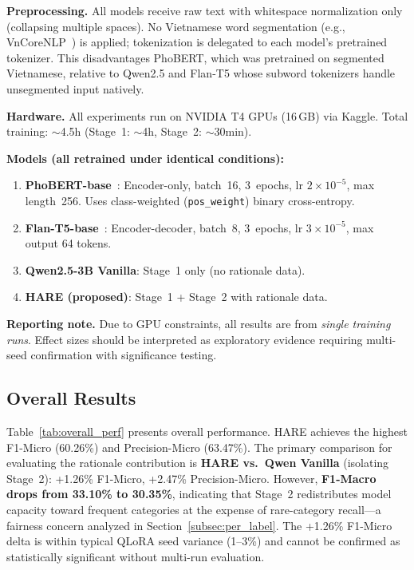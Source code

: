 \documentclass[conference]{IEEEtran}
\begin{document}
\textbf{Preprocessing.} All models receive raw text with whitespace
normalization only (collapsing multiple spaces). No Vietnamese word segmentation
(e.g., VnCoreNLP~\cite{Vu2018VnCoreNLP}) is applied; tokenization is delegated
to each model's pretrained tokenizer. This disadvantages PhoBERT, which was
pretrained on segmented Vietnamese, relative to Qwen2.5 and Flan-T5 whose
subword tokenizers handle unsegmented input natively.

\textbf{Hardware.} All experiments run on NVIDIA T4 GPUs (16\,GB) via Kaggle.
Total training: ${\sim}$4.5h (Stage~1: ${\sim}$4h, Stage~2: ${\sim}$30min).

\textbf{Models (all retrained under identical conditions):}
\begin{enumerate}[leftmargin=*]
\item \textbf{PhoBERT-base}~\cite{nguyen2020phobert}: Encoder-only, batch~16,
3~epochs, lr $2{\times}10^{-5}$, max length~256. Uses class-weighted
(\texttt{pos\_weight}) binary cross-entropy.
\item \textbf{Flan-T5-base}~\cite{chung2022scaling}: Encoder-decoder, batch~8,
3~epochs, lr $3{\times}10^{-5}$, max output 64 tokens.
\item \textbf{Qwen2.5-3B Vanilla}: Stage~1 only (no rationale data).
\item \textbf{HARE (proposed)}: Stage~1 + Stage~2 with rationale data.
\end{enumerate}

\textbf{Reporting note.} Due to GPU constraints, all results are from
\textit{single training runs}. Effect sizes should be interpreted as exploratory
evidence requiring multi-seed confirmation with significance testing.

\subsection{Overall Results}

Table~\ref{tab:overall_perf} presents overall performance. HARE achieves the
highest F1-Micro (60.26\%) and Precision-Micro (63.47\%). The primary comparison
for evaluating the rationale contribution is \textbf{HARE vs.\ Qwen Vanilla}
(isolating Stage~2): +1.26\% F1-Micro, +2.47\% Precision-Micro. However,
\textbf{F1-Macro drops from 33.10\% to 30.35\%}, indicating that Stage~2
redistributes model capacity toward frequent categories at the expense of
rare-category recall---a fairness concern analyzed in
Section~\ref{subsec:per_label}. The +1.26\% F1-Micro delta is within typical
QLoRA seed variance (1--3\%) and cannot be confirmed as statistically significant
without multi-run evaluation.
\end{document}
